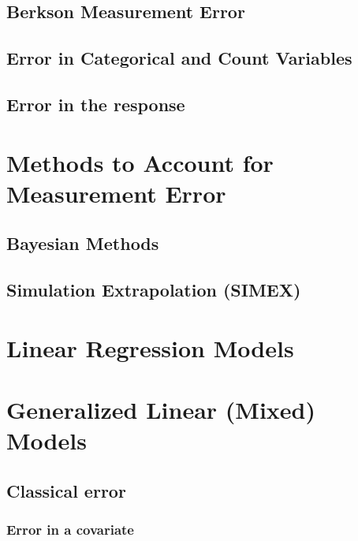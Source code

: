 \documentclass[]{book}
\theoremstyle{definition}
\theoremstyle{definition}
\theoremstyle{definition}
\theoremstyle{remark}
\begin{document}
\citep{fuller1987, galton1886}

\section{Berkson Measurement Error}\label{berkson-measurement-error}

\section{Error in Categorical and Count
Variables}\label{error-in-categorical-and-count-variables}

\section{Error in the response}\label{error-in-the-response}

\hypertarget{accounting}{\chapter{Methods to Account for Measurement
Error}\label{accounting}}

\section{Bayesian Methods}\label{bayesian-methods}

\section{Simulation Extrapolation
(SIMEX)}\label{simulation-extrapolation-simex}

\chapter{Linear Regression Models}\label{LinReg}

\chapter{Generalized Linear (Mixed) Models}\label{GLMMs}

\section{Classical error}\label{classical-error}

\subsection{Error in a covariate}\label{error-in-a-covariate}
\end{document}
